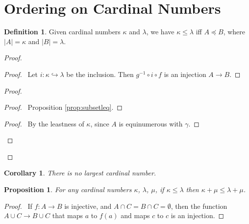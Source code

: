 \documentclass{book}
\let\qed\relax
\newtheorem{prop}[ax]{Proposition}
\newtheorem{cor}{Corollary}[ax]
\theoremstyle{definition}
\newtheorem{df}[ax]{Definition}
\begin{document}
\section{Ordering on Cardinal Numbers}

\begin{df}
Given cardinal numbers $\kappa$ and $\lambda$, we have $\kappa \leq \lambda$ iff $A \preccurlyeq B$, where $|A| = \kappa$ and $|B| = \lambda$.
\end{df}

\begin{proof}
\pf
{}
\begin{proof}
	\pf\ Let $i : \kappa \hookrightarrow \lambda$ be the inclusion. Then $g^{-1} \circ i \circ f$ is an injection $A \rightarrow B$.
\end{proof}
\begin{proof}
	\begin{proof}
		\pf\ Proposition \ref{prop:subsetleq}.
	\end{proof}
	\begin{proof}
		\pf\ By the leastness of $\kappa$, since $A$ is equinumerous with $\gamma$.
	\end{proof}
\end{proof}
\qed
\end{proof}

\begin{cor}
There is no largest cardinal number.
\end{cor}

\begin{prop}
For any cardinal numbers $\kappa$, $\lambda$, $\mu$, if $\kappa \leq \lambda$ then $\kappa + \mu \leq \lambda + \mu$.
\end{prop}

\begin{proof}
\pf\ If $f : A \rightarrow B$ is injective, and $A \cap C = B \cap C = \emptyset$, then the function $A \cup C \rightarrow B \cup C$ that maps $a$ to $f(a)$ and maps $c$ to $c$ is an injection. \qed
\end{proof}
\end{document}
